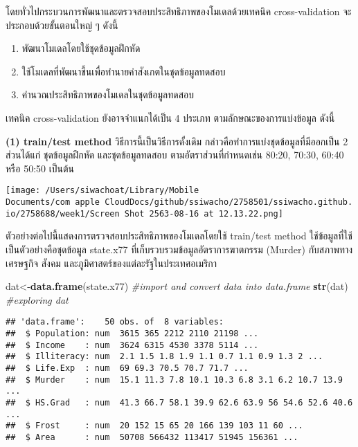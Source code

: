 \documentclass[
]{article}
\newenvironment{Shaded}{\begin{snugshade}}{\end{snugshade}}
\newcommand{\CommentTok}[1]{\textcolor[rgb]{0.56,0.35,0.01}{\textit{#1}}}
\newcommand{\KeywordTok}[1]{\textcolor[rgb]{0.13,0.29,0.53}{\textbf{#1}}}
\newcommand{\NormalTok}[1]{#1}
\begin{document}
โดยทั่วไปกระบวนการพัฒนาและตรวจสอบประสิทธิภาพของโมเดลด้วยเทคนิค
cross-validation จะประกอบด้วยขั้นตอนใหญ่ ๆ ดังนี้

\begin{enumerate}
\def\labelenumi{\arabic{enumi}.}
\item
  พัฒนาโมเดลโดยใช้ชุดข้อมูลฝึกหัด
\item
  ใช้โมเดลที่พัฒนาขึ้นเพื่อทำนายค่าสังเกตในชุดข้อมูลทดสอบ
\item
  คำนวณประสิทธิภาพของโมเดลในชุดข้อมูลทดสอบ
\end{enumerate}

เทคนิค cross-validation ยังอาจจำแนกได้เป็น 4 ประเภท
ตามลักษณะของการแบ่งข้อมูล ดังนี้

\textbf{(1) train/test method} วิธีการนี้เป็นวิธีการดั้งเดิม
กล่าวคือทำการแบ่งชุดข้อมูลที่มีออกเป็น 2 ส่วนได้แก่ ชุดข้อมูลฝึกหัด
และชุดข้อมูลทดสอบ ตามอัตราส่วนที่กำหนดเช่น 80:20, 70:30, 60:40 หรือ
50:50 เป็นต้น

\texttt{[image: /Users/siwachoat/Library/Mobile Documents/com~apple~CloudDocs/github/ssiwacho/2758501/ssiwacho.github.io/2758688/week1/Screen Shot 2563-08-16 at 12.13.22.png]}

ตัวอย่างต่อไปนี้แสดงการตรวจสอบประสิทธิภาพของโมเดลโดยใช้ train/test
method ใช้ข้อมูลที่ใช้เป็นตัวอย่างคือชุดข้อมูล state.x77
ที่เก็บรวบรวมข้อมูลอัตราการฆาตกรรม (Murder) กับสภาพทางเศรษฐกิจ สังคม
และภูมิศาสตร์ของแต่ละรัฐในประเทศอเมริกา

\begin{Shaded}
\begin{Highlighting}[]
\NormalTok{dat\textless{}{-}}\KeywordTok{data.frame}\NormalTok{(state.x77) }\CommentTok{\#import and convert data into data.frame}
\KeywordTok{str}\NormalTok{(dat) }\CommentTok{\#exploring dat}
\end{Highlighting}
\end{Shaded}

\begin{verbatim}
## 'data.frame':    50 obs. of  8 variables:
##  $ Population: num  3615 365 2212 2110 21198 ...
##  $ Income    : num  3624 6315 4530 3378 5114 ...
##  $ Illiteracy: num  2.1 1.5 1.8 1.9 1.1 0.7 1.1 0.9 1.3 2 ...
##  $ Life.Exp  : num  69 69.3 70.5 70.7 71.7 ...
##  $ Murder    : num  15.1 11.3 7.8 10.1 10.3 6.8 3.1 6.2 10.7 13.9 ...
##  $ HS.Grad   : num  41.3 66.7 58.1 39.9 62.6 63.9 56 54.6 52.6 40.6 ...
##  $ Frost     : num  20 152 15 65 20 166 139 103 11 60 ...
##  $ Area      : num  50708 566432 113417 51945 156361 ...
\end{verbatim}
\end{document}
